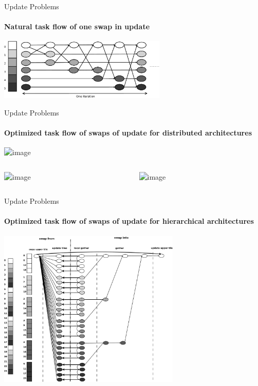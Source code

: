 \begin{frame}{Update Problems}
\framesubtitle{Natural task flow of one swap in update}
\begin{center}
\includegraphics[width=0.6\textwidth]{natural_swap_tf_bw}
\end{center}
\end{frame}

\begin{frame}{Update Problems}
\framesubtitle{Optimized task flow of swaps of update for distributed architectures}
\begin{center}
\includegraphics<4>[width=0.9\textwidth]{distributed_update_tf_bw}
\end{center}

\begin{columns}
\begin{column}{.45\textwidth}
\begin{flushright}
\includegraphics<1,3>[scale=0.2]{swap_from}
\end{flushright}
\end{column}
\begin{column}{.50\textwidth}
\begin{flushleft}
\includegraphics<2,3>[scale=0.2]{swap_into}
\end{flushleft}
\end{column}
\end{columns}
\end{frame}

\begin{frame}{Update Problems}
\framesubtitle{Optimized task flow of swaps of update  for hierarchical architectures}
\begin{center}
\includegraphics[width=0.65\textwidth]{update_tf_bw}
\end{center}
\end{frame}
